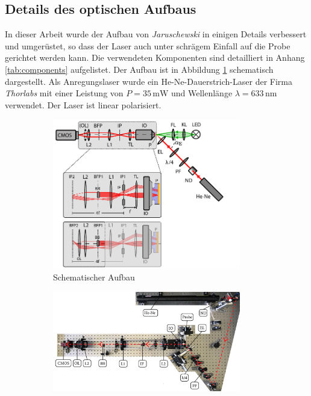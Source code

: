 \documentclass[titlepage,  ngerman]{article}
\begin{document}
	\subsection{Details des optischen Aufbaus}
	In dieser Arbeit wurde der Aufbau von \textit{Jaruschewski} \cite{Jaruschewski.2020} in einigen Details verbessert und umgerüstet, so dass der Laser auch unter schrägem Einfall auf die Probe gerichtet werden kann. Die verwendeten Komponenten sind detailliert in Anhang \ref{tab:components} aufgelistet. Der Aufbau ist in Abbildung \ref{fig:aufbau_schema} schematisch dargestellt. Als Anregungslaser wurde ein He-Ne-Dauerstrich-Laser der Firma \textit{Thorlabs} mit einer Leistung von $P = 35 \,\mathrm{mW}$ und Wellenlänge $\lambda = 633\,\mathrm{nm}$ verwendet. Der Laser ist linear polarisiert.
	\begin{figure}
		\centering
		\begin{subfigure}[b]{0.9\textwidth}		
			\centering
			\includegraphics[width=0.9\textwidth]{figures/Aufbau_Schema.pdf}
			\caption{Schematischer Aufbau}			
			\label{fig:aufbau_schema}
		\end{subfigure}
		\vfil
		\begin{subfigure}[b]{0.9\textwidth} 
			\centering
			\includegraphics[width=0.9\textwidth]{figures/aufsicht_aufbau_anotated.jpg}

\end{subfigure}
\end{figure}
\end{document}
